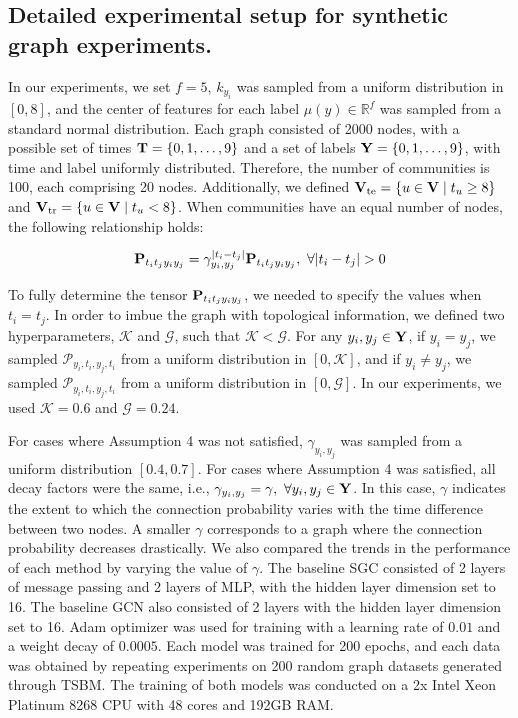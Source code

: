 \subsection{Detailed experimental setup for synthetic graph experiments.}
\label{apdx:synthetic_setup}
In our experiments, we set $f = 5$, $k_{y_i}$ was sampled from a uniform distribution in $[0, 8]$, and the center of features for each label $\mu(y) \in \mathbb{R}^f$ was sampled from a standard normal distribution. Each graph consisted of 2000 nodes, with a possible set of times $\bold{T} = \{0, 1, \dots, 9\}$ and a set of labels $\bold{Y} = \{0, 1, \dots, 9\}$, with time and label uniformly distributed. Therefore, the number of communities is 100, each comprising 20 nodes. Additionally, we defined $\bold{V}_{\text{te}} = \{u \in \bold{V} \mid t_u \ge 8\}$ and $\bold{V}_{\text{tr}} = \{u \in \bold{V} \mid t_u < 8\}$. When communities have an equal number of nodes, the following relationship holds:

\vspace{-15pt}
\begin{align}
    \bold{P}_{t_i t_j y_i y_j} = \gamma_{y_i, y_j}^{|t_i - t_j|} \bold{P}_{t_i t_j y_i y_j} ,\ \forall |t_i - t_j |>0
\end{align}
\vspace{-5pt}

To fully determine the tensor $\bold{P}_{t_i t_j y_i y_j}$, we needed to specify the values when $t_i = t_j$. In order to imbue the graph with topological information, we defined two hyperparameters, $\mathcal{K}$ and $\mathcal{G}$, such that $\mathcal{K} < \mathcal{G}$. For any $y_i, y_j \in \bold{Y}$, if $y_i = y_j$, we sampled $\mathcal{P}_{y_i, t_i, y_j, t_i}$ from a uniform distribution in $[0, \mathcal{K}]$, and if $y_i \ne y_j$, we sampled $\mathcal{P}_{y_i, t_i, y_j, t_i}$ from a uniform distribution in $[0, \mathcal{G}]$. In our experiments, we used $\mathcal{K} = 0.6$ and $\mathcal{G} = 0.24$. 

For cases where Assumption 4 was not satisfied, $\gamma_{y_i, y_j}$ was sampled from a uniform distribution $[0.4, 0.7]$. For cases where Assumption 4 was satisfied, all decay factors were the same, i.e., $\gamma_{y_i, y_j} = \gamma, \ \forall y_i, y_j \in \bold{Y}$. In this case, $\gamma$ indicates the extent to which the connection probability varies with the time difference between two nodes. A smaller $\gamma$ corresponds to a graph where the connection probability decreases drastically. We also compared the trends in the performance of each \IMPaCT method by varying the value of $\gamma$. The baseline SGC consisted of 2 layers of message passing and 2 layers of MLP, with the hidden layer dimension set to 16. The baseline GCN also consisted of 2 layers with the hidden layer dimension set to 16. Adam optimizer was used for training with a learning rate of $0.01$ and a weight decay of $0.0005$. Each model was trained for 200 epochs, and each data was obtained by repeating experiments on 200 random graph datasets generated through TSBM. The training of both models was conducted on a 2x Intel Xeon Platinum 8268 CPU with 48 cores and 192GB RAM. 


